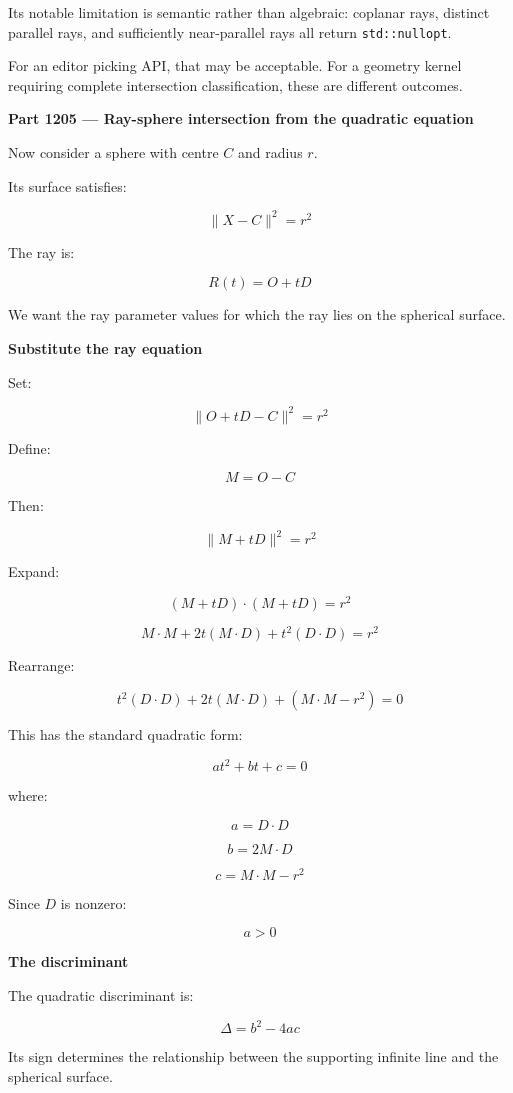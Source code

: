 Its notable limitation is semantic rather than algebraic: coplanar rays, distinct parallel rays, and sufficiently near-parallel rays all return \texttt{std::nullopt}.

For an editor picking API, that may be acceptable. For a geometry kernel requiring complete intersection classification, these are different outcomes.

\textbf{Part 1205 --- Ray-sphere intersection from the quadratic equation}

Now consider a sphere with centre \(C\) and radius \(r\).

Its surface satisfies:

\[
\boxed{ \|X-C\|^2=r^2 }
\]

The ray is:

\[
R(t)=O+tD
\]

We want the ray parameter values for which the ray lies on the spherical surface.

\textbf{Substitute the ray equation}

Set:

\[
\|O+tD-C\|^2=r^2
\]

Define:

\[
M=O-C
\]

Then:

\[
\|M+tD\|^2=r^2
\]

Expand:

\[
(M+tD)\cdot(M+tD)=r^2
\]

\[
M\cdot M+2t(M\cdot D)+t^2(D\cdot D)=r^2
\]

Rearrange:

\[
t^2(D\cdot D)+2t(M\cdot D)+(M\cdot M-r^2)=0
\]

This has the standard quadratic form:

\[
\boxed{at^2+bt+c=0}
\]

where:

\[
\boxed{ a=D\cdot D }
\]

\[
\boxed{ b=2M\cdot D }
\]

\[
\boxed{ c=M\cdot M-r^2 }
\]

Since \(D\) is nonzero:

\[
a>0
\]

\textbf{The discriminant}

The quadratic discriminant is:

\[
\boxed{ \Delta=b^2-4ac }
\]

Its sign determines the relationship between the supporting infinite line and the spherical surface.

